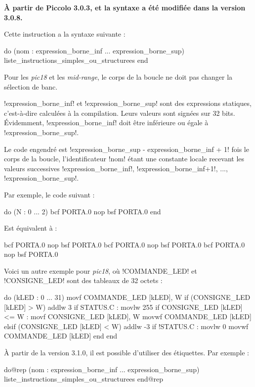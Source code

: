 
\textbf{À partir de Piccolo 3.0.3, et la syntaxe a été modifiée dans la version 3.0.8.}


Cette instruction a la syntaxe suivante :
\begin{piccolo}
do (nom : expression_borne_inf ... expression_borne_sup)
  liste_instructions_simples_ou_structurees
end
\end{piccolo}

Pour les \emph{pic18} et les \emph{mid-range}, le corps de la boucle ne doit pas changer la sélection de banc.

\pic!expression_borne_inf! et \pic!expression_borne_sup! sont des expressions statiques, c'est-à-dire calculées à la compilation. Leurs valeurs sont signées sur 32 bits. Évidemment, \pic!expression_borne_inf! doit être inférieure ou égale à \pic!expression_borne_sup!.

Le code engendré est \pic!expression_borne_sup - expression_borne_inf + 1! fois le corps de la boucle, l'identificateur \pic!nom! étant une constante locale recevant les valeurs successives \pic!expression_borne_inf!, \pic!expression_borne_inf+1!, ..., \pic!expression_borne_sup!.


Par exemple, le code suivant :
\begin{piccolo}
do (N : 0 ... 2)
  bcf PORTA.0
  nop
  bsf PORTA.0
end
\end{piccolo}

Est équivalent à :
\begin{piccolo}
bcf PORTA.0
nop
bsf PORTA.0
bcf PORTA.0
nop
bsf PORTA.0
bcf PORTA.0
nop
bsf PORTA.0
\end{piccolo}


Voici un autre exemple pour \emph{pic18}, où \pic!COMMANDE_LED! et \pic!CONSIGNE_LED! sont des tableaux de 32 octets :

\begin{piccolo}
do (kLED : 0 ... 31)
  movf COMMANDE_LED [kLED], W
  if (CONSIGNE_LED [kLED] > W)
    addlw 3
    if STATUS.C : movlw 255
    if CONSIGNE_LED [kLED] <= W : movf CONSIGNE_LED [kLED], W
    movwf COMMANDE_LED [kLED]
  elsif (CONSIGNE_LED [kLED] < W)
    addlw -3
    if !STATUS.C : movlw 0
    movwf COMMANDE_LED [kLED]
  end
end
\end{piccolo}



À partir de la version 3.1.0, il est possible d'utiliser des étiquettes. Par exemple :
\begin{piccolo}
do@rep (nom : expression_borne_inf ... expression_borne_sup)
  liste_instructions_simples_ou_structurees
end@rep
\end{piccolo}

